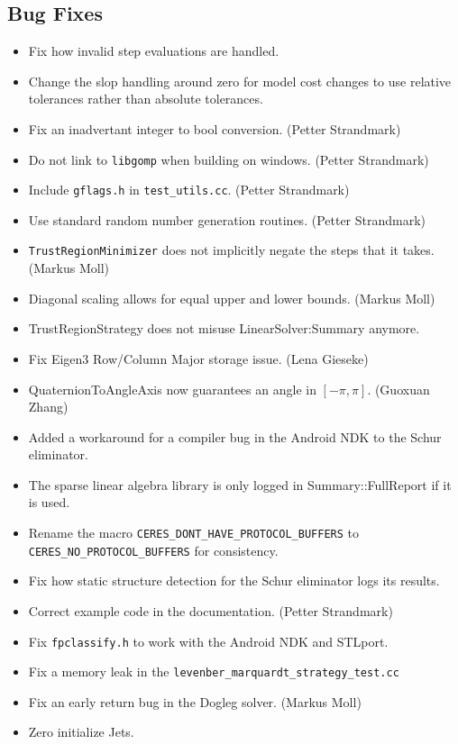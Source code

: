 \subsection{Bug Fixes}
\begin{itemize}
\item Fix how invalid step evaluations are handled.
\item Change the slop handling around zero for model cost changes to use
relative tolerances rather than absolute tolerances.
\item Fix an inadvertant integer to bool conversion. (Petter Strandmark)
\item Do not link to \texttt{libgomp} when building on
  windows. (Petter Strandmark)
\item Include \texttt{gflags.h} in \texttt{test\_utils.cc}. (Petter
  Strandmark)
\item Use standard random number generation routines. (Petter Strandmark)
\item \texttt{TrustRegionMinimizer} does not implicitly negate the
  steps that it takes. (Markus Moll)
\item Diagonal scaling allows for equal upper and lower bounds. (Markus Moll)
\item TrustRegionStrategy does not misuse LinearSolver:Summary anymore.
\item Fix Eigen3 Row/Column Major storage issue. (Lena Gieseke)
\item QuaternionToAngleAxis now guarantees an angle in $[-\pi, \pi]$. (Guoxuan Zhang)
\item Added a workaround for a compiler bug in the Android NDK to the
  Schur eliminator.
\item The sparse linear algebra library is only logged in
  Summary::FullReport if it is used.
\item Rename the macro \texttt{CERES\_DONT\_HAVE\_PROTOCOL\_BUFFERS}
  to \texttt{CERES\_NO\_PROTOCOL\_BUFFERS} for consistency.
\item Fix how static structure detection for the Schur eliminator logs
  its results.
\item Correct example code in the documentation. (Petter Strandmark)
\item Fix \texttt{fpclassify.h} to work with the Android NDK and STLport.
\item Fix a memory leak in the \texttt{levenber\_marquardt\_strategy\_test.cc}
\item Fix an early return bug in the Dogleg solver. (Markus Moll)
\item Zero initialize Jets.

\end{itemize}
